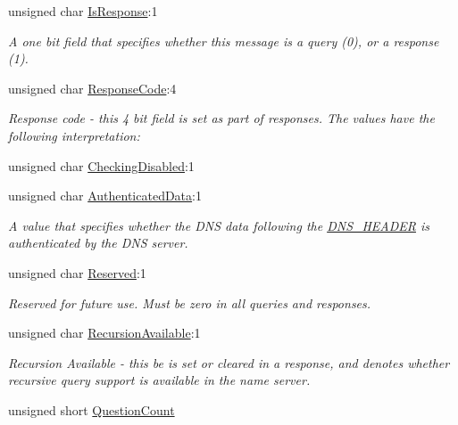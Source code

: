\begin{DoxyCompactItemize}
unsigned char \hyperlink{struct_senergy_1_1_dns_1_1_message_header_fields_a0d0ac4fa85684c3d66a84e3392f3ef99}{Is\-Response}\-:1
\begin{DoxyCompactList}\small\item\em A one bit field that specifies whether this message is a query (0), or a response (1). \end{DoxyCompactList}\item 
unsigned char \hyperlink{struct_senergy_1_1_dns_1_1_message_header_fields_a2f42c94d4e50dd7a63b11c8b374597c4}{Response\-Code}\-:4
\begin{DoxyCompactList}\small\item\em Response code -\/ this 4 bit field is set as part of responses. The values have the following interpretation\-: \end{DoxyCompactList}\item 
unsigned char \hyperlink{struct_senergy_1_1_dns_1_1_message_header_fields_a2c846064b4582f46a94bd90b32ef1cd9}{Checking\-Disabled}\-:1
\item 
unsigned char \hyperlink{struct_senergy_1_1_dns_1_1_message_header_fields_a3788cbe9e2663b3be0cad8cbca8dc985}{Authenticated\-Data}\-:1
\begin{DoxyCompactList}\small\item\em A value that specifies whether the D\-N\-S data following the \hyperlink{struct_d_n_s___h_e_a_d_e_r}{D\-N\-S\-\_\-\-H\-E\-A\-D\-E\-R} is authenticated by the D\-N\-S server. \end{DoxyCompactList}\item 
unsigned char \hyperlink{struct_senergy_1_1_dns_1_1_message_header_fields_afb988d15085d4f740df367d1792440c7}{Reserved}\-:1
\begin{DoxyCompactList}\small\item\em Reserved for future use. Must be zero in all queries and responses. \end{DoxyCompactList}\item 
unsigned char \hyperlink{struct_senergy_1_1_dns_1_1_message_header_fields_afbb68b60a28f855e64eb13615fc2633e}{Recursion\-Available}\-:1
\begin{DoxyCompactList}\small\item\em Recursion Available -\/ this be is set or cleared in a response, and denotes whether recursive query support is available in the name server. \end{DoxyCompactList}\item 
unsigned short \hyperlink{struct_senergy_1_1_dns_1_1_message_header_fields_a8af9bbfa134c9e0d4fc846103f7b72ad}{Question\-Count}

\end{DoxyCompactItemize}
